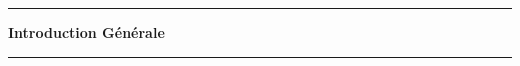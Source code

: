 \newpage
\thispagestyle{empty}
\vspace*{\fill}
\begin{center}
\rule{0.8\textwidth}{0.5pt}

\vspace{1cm}
{\Huge\bfseries Introduction Générale}
\vspace{1cm}

\rule{0.8\textwidth}{0.5pt}
\end{center}
\vspace*{\fill}
\newpage
